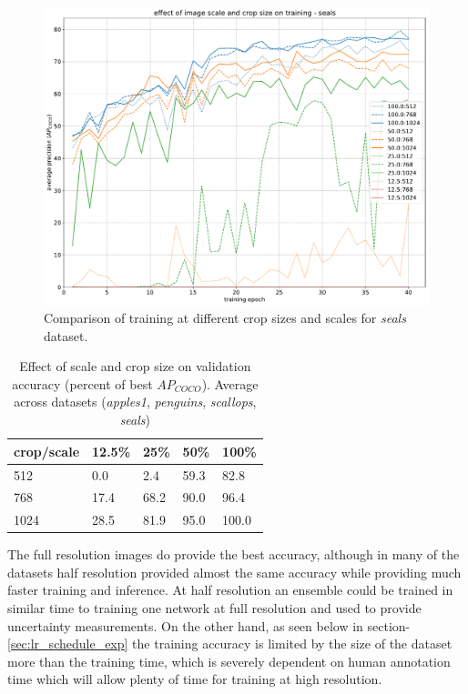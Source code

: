  
\begin{figure}[h]
  \centering
  \includegraphics[width=1.0\linewidth]{charts/training/crops_scales/seals.pdf}
  \caption{Comparison of training at different crop sizes and scales for \emph{seals} dataset. }  
  \label{fig:seals_crop_scale}
\end{figure}


\begin{table}[ht]
  \centering
    \caption{Effect of scale and crop size on validation accuracy (percent of best $AP_{COCO}$). Average across datasets (\emph{apples1}, \emph{penguins}, \emph{scallops}, \emph{seals}) }

  \begin{tabular}{ l | l l l l}
    crop/scale & 12.5\% & 25\% & 50\% & 100\% \\
    \toprule
        512   & 0.0  & 2.4  &  59.3  & 82.8 \\
        768   & 17.4 & 68.2  &  90.0 &  96.4 \\
        1024  & 28.5 & 81.9  &  95.0  & 100.0 \\
    \bottomrule
  \end{tabular}
\label{fig:accuracy_scale_crop}
\end{table}


The full resolution images do provide the best accuracy, although in many of the datasets half resolution provided almost the same accuracy while providing much faster training and inference. At half resolution an ensemble could be trained in similar time to training one network at full resolution and used to provide uncertainty measurements. On the other hand, as seen below in section-\ref{sec:lr_schedule_exp} the training accuracy is limited by the size of the dataset more than the training time, which is severely dependent on human annotation time which will allow plenty of time for training at high resolution.

